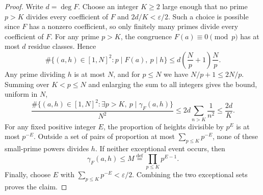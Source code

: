 \documentclass[10pt,a4paper]{amsart}
\newcommand{\defeq}{\stackrel{\mathrm{def}}{=}}
\begin{document}
\begin{proof}
Write $d=\deg F$. Choose an integer $K\geq2$ large enough that no prime
$p>K$ divides every coefficient of $F$ and $2d/K<\varepsilon/2$.
Such a choice is possible since $F$ has a nonzero coefficient, so only
finitely many primes divide every coefficient of $F$. For any prime $p>K$, the congruence $F(a)\equiv0\pmod p$
has at most $d$ residue classes. Hence
\[
 \#\{(a,h)\in[1,N]^2:p\mid F(a),\ p\mid h\}
 \leq d\left(\frac Np+1\right)\frac Np.
\]
Any prime dividing $h$ is at most $N$, and for $p\leq N$ we have
$N/p+1\leq2N/p$. Summing over $K<p\leq N$ and enlarging the sum to
all integers gives the bound, uniform in $N$,
\begin{equation}\label{eq:large-primes}
 \frac{\#\{(a,h)\in[1,N]^2:\exists p>K,\ p\mid\gamma_F(a,h)\}}{N^2}
 \leq 2d\sum_{n>K}\frac1{n^2}\leq\frac{2d}{K}.
\end{equation}
For any fixed positive integer $E$,
the proportion of heights divisible by $p^E$ is at most $p^{-E}$.
Outside a set of pairs of proportion at most
$\sum_{p\leq K}p^{-E}$, none of these small-prime powers divides $h$.
If neither exceptional event occurs, then
\[
       \gamma_F(a,h)\leq M\defeq\prod_{p\leq K}p^{E-1}.
\]
Finally, choose $E$ with $\sum_{p\leq K}p^{-E}<\varepsilon/2$. Combining the two exceptional
sets proves the claim.
\end{proof}
\end{document}
